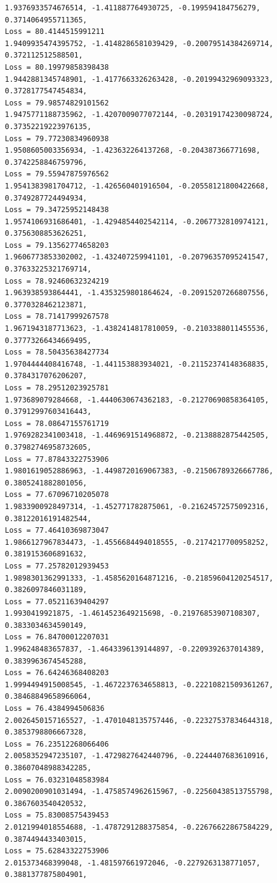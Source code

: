 \documentclass[11pt]{article}
\begin{document}
\begin{Verbatim}[commandchars=\\\{\}]
1.9376933574676514, -1.411887764930725, -0.199594184756279, 0.3714064955711365,
Loss = 80.4144515991211
1.9409935474395752, -1.4148286581039429, -0.20079514384269714,
0.372112512588501,
Loss = 80.19979858398438
1.9442881345748901, -1.4177663326263428, -0.20199432969093323,
0.3728177547454834,
Loss = 79.98574829101562
1.9475771188735962, -1.4207009077072144, -0.20319174230098724,
0.37352219223976135,
Loss = 79.77230834960938
1.9508605003356934, -1.423632264137268, -0.204387366771698, 0.3742258846759796,
Loss = 79.55947875976562
1.9541383981704712, -1.426560401916504, -0.20558121800422668,
0.3749287724494934,
Loss = 79.34725952148438
1.9574106931686401, -1.4294854402542114, -0.2067732810974121,
0.3756308853626251,
Loss = 79.13562774658203
1.9606773853302002, -1.432407259941101, -0.20796357095241547,
0.37633225321769714,
Loss = 78.92460632324219
1.963938593864441, -1.4353259801864624, -0.20915207266807556,
0.3770328462123871,
Loss = 78.71417999267578
1.9671943187713623, -1.4382414817810059, -0.2103388011455536,
0.37773266434669495,
Loss = 78.50435638427734
1.9704444408416748, -1.441153883934021, -0.21152374148368835,
0.3784317076206207,
Loss = 78.29512023925781
1.973689079284668, -1.4440630674362183, -0.21270690858364105,
0.37912997603416443,
Loss = 78.08647155761719
1.9769282341003418, -1.4469691514968872, -0.2138882875442505,
0.37982746958732605,
Loss = 77.87843322753906
1.9801619052886963, -1.4498720169067383, -0.21506789326667786,
0.3805241882801056,
Loss = 77.67096710205078
1.9833900928497314, -1.452771782875061, -0.21624572575092316,
0.38122016191482544,
Loss = 77.46410369873047
1.9866127967834473, -1.4556684494018555, -0.2174217700958252,
0.3819153606891632,
Loss = 77.25782012939453
1.9898301362991333, -1.4585620164871216, -0.21859604120254517,
0.3826097846031189,
Loss = 77.05211639404297
1.9930419921875, -1.4614523649215698, -0.21976853907108307, 0.3833034634590149,
Loss = 76.84700012207031
1.996248483657837, -1.4643396139144897, -0.2209392637014389, 0.3839963674545288,
Loss = 76.64246368408203
1.9994494915008545, -1.4672237634658813, -0.22210821509361267,
0.38468849658966064,
Loss = 76.4384994506836
2.0026450157165527, -1.4701048135757446, -0.22327537834644318,
0.3853798806667328,
Loss = 76.23512268066406
2.0058352947235107, -1.4729827642440796, -0.2244407683610916,
0.38607048988342285,
Loss = 76.03231048583984
2.0090200901031494, -1.4758574962615967, -0.22560438513755798,
0.3867603540420532,
Loss = 75.83008575439453
2.0121994018554688, -1.4787291288375854, -0.22676622867584229,
0.3874494433403015,
Loss = 75.62843322753906
2.015373468399048, -1.481597661972046, -0.2279263138771057, 0.3881377875804901,

\end{Verbatim}
\end{document}
